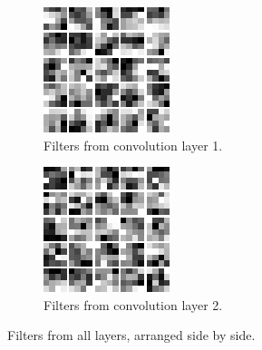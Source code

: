 \documentclass{article}
\begin{document}
\begin{figure}[h!]
\begin{subfigure}[t]{0.3\textwidth}
        \includegraphics[width=\textwidth]{./plots/layer_1_plot.png}
        \caption{Filters from convolution layer 1.}
        \label{fig:subfig17b}
    \end{subfigure}
    \hfill
    \begin{subfigure}[t]{0.3\textwidth}
        \centering
        \includegraphics[width=\textwidth]{./plots/layer_2_plot.png}
        \caption{Filters from convolution layer 2.}
        \label{fig:subfig17c}
    \end{subfigure}
    \caption{Filters from all layers, arranged side by side.}
    \label{fig:plot17}
\end{figure}
\end{document}
